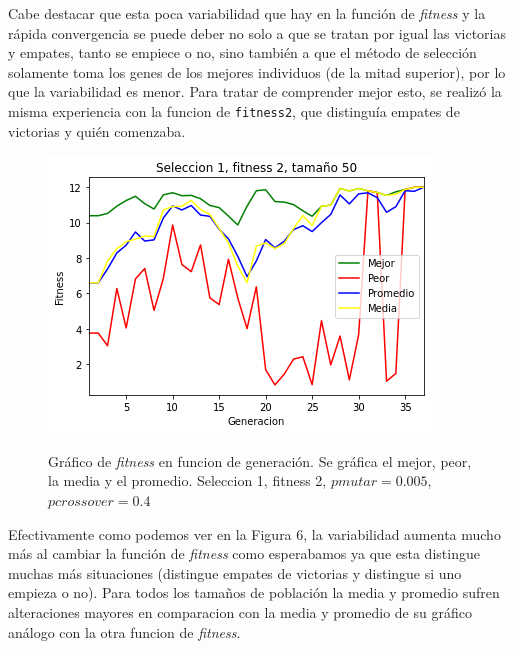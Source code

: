\documentclass[A4paper,oneside,fleqn,11pt]{article}
\theoremstyle{definition}
\begin{document}
Cabe destacar que esta poca variabilidad que hay en la función de \textit{fitness} y la rápida convergencia se puede deber no solo a que se tratan por igual las victorias y empates, tanto se empiece o no, sino también a que el método de selección solamente toma los genes de los mejores individuos (de la mitad superior), por lo que la variabilidad es menor. Para tratar de comprender mejor esto, se realizó la misma experiencia con la funcion de \texttt{fitness2}, que distinguía empates de victorias y quién comenzaba.





\begin{figure}[H]
	\captionsetup[subfigure]{position=b}
	\centering
		{\includegraphics[width=0.3\linewidth]{s1f2t50.png}}
	\caption{Gráfico de \textit{fitness} en funcion de generación. Se gráfica el mejor, peor, la media y el promedio. Seleccion 1, fitness 2, $pmutar=0.005$, $pcrossover=0.4$}
\end{figure}

Efectivamente como podemos ver en la Figura 6, la variabilidad aumenta mucho más al cambiar la función de \textit{fitness} como esperabamos ya que esta distingue muchas más situaciones (distingue empates de victorias y distingue si uno empieza o no). Para todos los tamaños de población la media y promedio sufren alteraciones mayores en comparacion con la media y promedio de su gráfico análogo con la otra funcion de \textit{fitness}.
\end{document}
